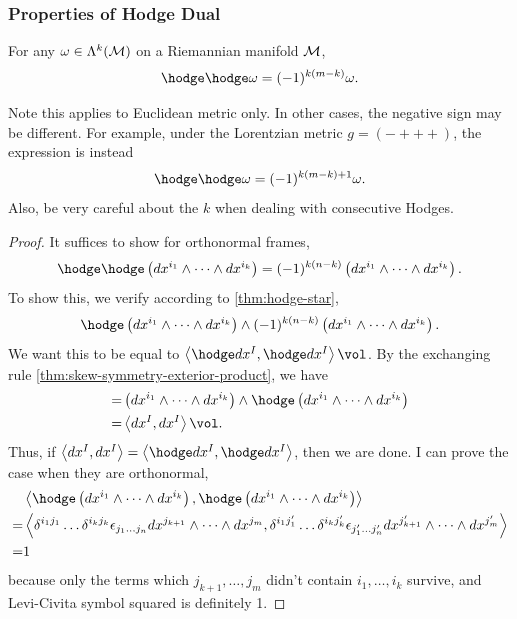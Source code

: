 \documentclass[../main.tex]{subfiles}
\begin{document}
    \subsubsection{Properties of Hodge Dual}
    \begin{theorem}\label{thm:double-hodge-dual}
        For any \(\omega \in \form{k}{M}\) on a Riemannian manifold \(\manifold[M]\),
        \[
        \hodge\hodge\omega=(-1)^{k(m-k)}\omega.
        \]
    \end{theorem}
    \begin{remark}
        Note this applies to Euclidean metric only. In other cases, the negative sign 
        may be different. For example, under the Lorentzian metric 
        \(g=({-}{+}{+}{+})\), the expression is instead 
        \[
        \hodge\hodge\omega=(-1)^{k(m-k)+1}\omega.
        \]
        Also, be very careful about the \(k\) when dealing with consecutive Hodges.
    \end{remark}
    \begin{proof}
        It suffices to show for orthonormal frames, 
        \[
        \hodge\hodge \left(dx^{i_1}\wedge\dots\wedge dx^{i_k}\right)
        =(-1)^{k(n-k)}\left(dx^{i_1}\wedge\dots\wedge dx^{i_k}\right).
        \]
        To show this, we verify according to \cref{thm:hodge-star},
        \[
        \hodge \left(dx^{i_1}\wedge\dots\wedge dx^{i_k}\right)
        \wedge (-1)^{k(n-k)}\left(dx^{i_1}\wedge\dots\wedge dx^{i_k}\right).
        \]
        We want this to be equal to \(\left<\hodge dx^I, \hodge dx^I\right>\vol\). 
        By the exchanging rule \cref{thm:skew-symmetry-exterior-product}, we have 
        \[
        \begin{aligned}
            =&\left(dx^{i_1}\wedge\dots\wedge dx^{i_k}\right)\wedge
            \hodge\left(dx^{i_1}\wedge\dots\wedge dx^{i_k}\right)\\
            =&\left<dx^I, dx^I\right>\vol.
        \end{aligned}
        \]
        Thus, if \(\left<dx^I, dx^I\right>=\left<\hodge dx^I, \hodge dx^I\right>\), 
        then we are done. I can prove the case when they are orthonormal, 
        \[
        \begin{aligned}
            &\left<\hodge \left(dx^{i_1}\wedge\dots\wedge dx^{i_k}\right), 
            \hodge \left(dx^{i_1}\wedge\dots\wedge dx^{i_k}\right)\right>\\
            =&\left<\delta^{i_1j_1}\dots\delta^{i_kj_k}\epsilon_{j_1\dots j_n}
            dx^{j_{k+1}}\wedge\dots\wedge dx^{j_m}, 
            \delta^{i_1j_1'}\dots\delta^{i_kj_k'}\epsilon_{j_1'\dots j_n'}
            dx^{j_{k+1}'}\wedge\dots\wedge dx^{j_m'}\right>\\
            =&1
        \end{aligned}
        \]
        because only the terms which \(j_{k+1}, \dots, j_m\) didn't contain 
        \(i_1, \dots, i_k\) survive, and Levi-Civita symbol squared is definitely 1.
    \end{proof}
\end{document}
